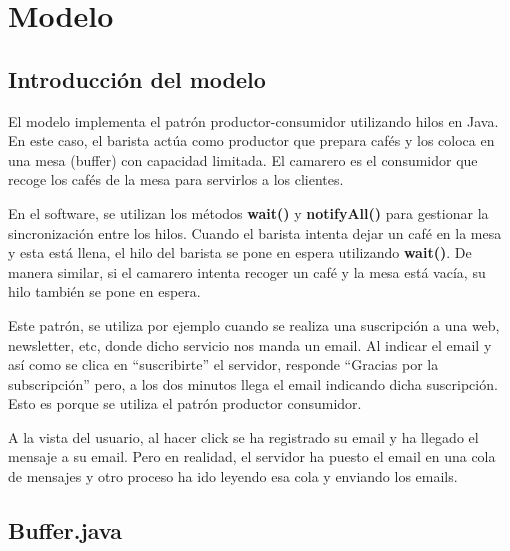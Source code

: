 \documentclass[14pt]{extarticle}
\begin{document}
    \newpage
    \section{Modelo}

    \subsection{Introducción del modelo}
    
        El modelo implementa el patrón productor-consumidor utilizando hilos en Java. En este caso, el barista actúa como productor que prepara cafés y los coloca en una mesa (buffer) con capacidad limitada. El camarero es el consumidor que recoge los cafés de la mesa para servirlos a los clientes.
        \vspace{0.5cm}        

        En el software, se utilizan los métodos \textbf{wait()} y \textbf{notifyAll()} para gestionar la sincronización entre los hilos. Cuando el barista intenta dejar un café en la mesa y esta está llena, el hilo del barista se pone en espera utilizando \textbf{wait()}. De manera similar, si el camarero intenta recoger un café y la mesa está vacía, su hilo también se pone en espera.

        \vspace{0.5cm}

        \begin{tcolorbox}
            [colback=blue!5!white,colframe=blue!50!black,fonttitle=\bfseries,title=Ejemplo]

            Este patrón, se utiliza por ejemplo cuando se realiza una suscripción a una web, newsletter, etc, donde dicho servicio nos manda un email. Al indicar el email y así como se clica en “suscribirte” el servidor, responde “Gracias por la subscripción” pero, a los dos minutos llega el email indicando dicha suscripción. Esto es porque se utiliza el patrón productor consumidor.

            \vspace{0.5cm}
            A la vista del usuario, al hacer click se ha registrado su email y ha llegado el mensaje a su email. Pero en realidad, el servidor ha puesto el email en una cola de mensajes y otro proceso ha ido leyendo esa cola y enviando los emails.
        \end{tcolorbox}



    \newpage
    \subsection{Buffer.java}
\end{document}
